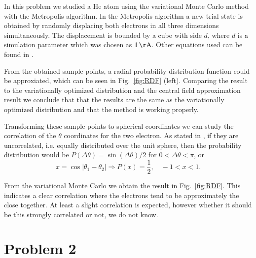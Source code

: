 In this problem we studied a He atom using the variational Monte Carlo method with the Metropolis algorithm. In the Metropolis algorithm a new trial state is obtained by randomly displacing both electrons in all three dimensions simultaneously. The displacement is bounded by a cube with side $d$, where $d$ is a simulation parameter which was chosen as $\unit[1]{\AA}$. Other equations used can be found in \cite{probdesc}.

From the obtained sample points, a radial probability distribution function could be approxiated, which can be seen in Fig.~\ref{fig:RDF} (left). Comparing the result to the variationally optimized distribution and the central field approximation result we conclude that that the results are the same as the variationally optimized distribution and that the method is working properly.

Transforming these sample points to spherical coordinates we can study the correlation of the $\theta$ coordinates for the two electron. As stated in \cite{probdesc}, if they are uncorrelated, i.e. equally distributed over the unit sphere, then the probability distribution would be $P(\Delta \theta) = \sin (\Delta \theta) / 2$ for $0 < \Delta\theta < \pi$, or
\begin{equation}
	x = \cos \left|\theta_1 - \theta_2\right| \Rightarrow P(x) = \frac{1}{2},\quad -1 < x < 1.
\end{equation}

From the variational Monte Carlo we obtain the result in Fig.~\ref{fig:RDF}. This indicates a clear correlation where the electrons tend to be approximately the close together. At least a slight correlation is expected, however whether it should be this strongly correlated or not, we do not know.

\section*{Problem 2}

